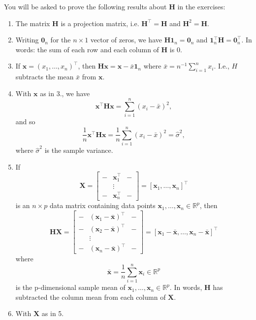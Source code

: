 \documentclass[]{book}
\providecommand{\tightlist}{%
  \setlength{\itemsep}{0pt}\setlength{\parskip}{0pt}}
\theoremstyle{definition}
\theoremstyle{definition}
\theoremstyle{definition}
\theoremstyle{remark}
\begin{document}
You will be asked to prove the following results about \(\mathbf H\) in the exercises:

\begin{enumerate}
\def\labelenumi{\arabic{enumi}.}
\tightlist
\item
  The matrix \(\mathbf H\) is a projection matrix, i.e. \(\mathbf H^\top =\mathbf H\) and \(\mathbf H^2=\mathbf H\).
\item
  Writing \({\mathbf 0}_n\) for the \(n \times 1\) vector of zeros, we have
  \(\mathbf H{\mathbf 1}_n={\mathbf 0}_n\) and \({\mathbf 1}_n^\top \mathbf H={\mathbf 0}_n^\top.\) In words: the sum of each row and each column of \(\mathbf H\) is \(0\).
\item
  If \(\mathbf x=(x_1, \ldots , x_n)^\top\), then \(\mathbf H\mathbf x= \mathbf x- \bar{x}{\mathbf 1}_n\) where \(\bar{x}=n^{-1}\sum_{i=1}^n x_i\). I.e., \(H\) subtracts the mean \(\bar{x}\) from \(\mathbf x\).
\item
  With \(\mathbf x\) as in 3., we have
  \[
  \mathbf x^\top \mathbf H\mathbf x= \sum_{i=1}^n (x_i-\bar{x})^2,
  \]
  and so
  \[
  \frac{1}{n}\mathbf x^\top \mathbf H\mathbf x=\frac{1}{n}\sum_{i=1}^n (x_i-\bar{x})^2 = \hat{\sigma}^2,
  \]
  where \(\hat{\sigma}^2\) is the sample variance.
\item
  If
  \[\mathbf X=\left[\begin{array}{ccc}-&\mathbf x_1^\top&-\\ 
  &\vdots& \\ -&\mathbf x_n^\top&-\end{array}\right] = [\mathbf x_1, \ldots, \mathbf x_n]^\top\]
  is an \(n \times p\) data matrix containing data points \(\mathbf x_1, \ldots, \mathbf x_n\in \mathbb{R}^p\), then
  \[
  \mathbf H\mathbf X=\left[ \begin{array}{ccc}
  -&(\mathbf x_1-\bar{\mathbf x})^\top&-\\
  -&(\mathbf x_2 -\bar{\mathbf x})^\top&-\\
  &\vdots&\\
  -&(\mathbf x_n - \bar{\mathbf x})^\top&-
  \end{array}\right ]= \left[ \mathbf x_1 -\bar{\mathbf x}, \ldots , \mathbf x_n-\bar{\mathbf x}\right]^\top
  \]
  where \[\bar{\mathbf x} = \frac{1}{n} \sum_{i=1}^n \mathbf x_i \in \mathbb{R}^p\]
  is the p-dimensional sample mean of \(\mathbf x_1, \ldots, \mathbf x_n\in \mathbb{R}^p\). In words, \(\mathbf H\) has subtracted the column mean from each column of \(\mathbf X\).
\item
  With \(\mathbf X\) as in 5.

\end{enumerate}
\end{document}
